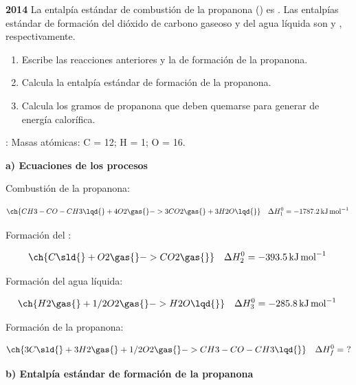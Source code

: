 \begin{exerciseEVAU}
    \textbf{2014} La entalpía estándar de combustión de la propanona () es . Las entalpías estándar de formación del dióxido de carbono gaseoso y del agua líquida son  y , respectivamente.
    \begin{enumerate}[label=\letraminuscula]
    \item Escribe las reacciones anteriores y la de formación de la propanona.
    \item Calcula la entalpía estándar de formación de la propanona.
    \item Calcula los gramos de propanona que deben quemarse para generar  de energía calorífica.
    \end{enumerate}
    \datos{}: Masas atómicas: C = 12; H = 1; O = 16.

    \begin{solu}

        \textbf{a) Ecuaciones de los procesos}

        Combustión de la propanona:

        \begin{equation*}
            \ch{CH3-CO-CH3 \lqd{} + 4 O2 \gas{} -> 3 CO2 \gas{} + 3 H2O \lqd{}} \quad \Delta H^0_1 = \energia[kjmol]{-1787.2}
        \end{equation*}

        Formación del :

        \begin{equation*}
            \ch{C \sld{} + O2 \gas{} -> CO2 \gas{}} \quad \Delta H^0_2 = \energia[kjmol]{-393.5}
        \end{equation*}

        Formación del agua líquida:

        \begin{equation*}
            \ch{H2 \gas{} + 1/2 O2 \gas{} -> H2O \lqd{}} \quad \Delta H^0_3 = \energia[kjmol]{-285.8}
        \end{equation*}

        Formación de la propanona:

        \begin{equation*}
            \ch{3 C \sld{} + 3 H2 \gas{} + 1/2 O2 \gas{} -> CH3-CO-CH3 \lqd{}} \quad \Delta H^0_f = \ ?
        \end{equation*}

        \textbf{b) Entalpía estándar de formación de la propanona}


\end{solu}
\end{exerciseEVAU}
